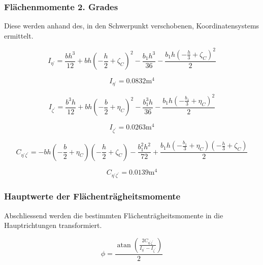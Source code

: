 \documentclass[
  12pt,
  letterpaper,
  DIV=11,
  egregdoesnotlikesansseriftitles]{scrartcl}
\begin{document}
\hypertarget{fluxe4chenmomente-2.-grades}{%
\subsubsection{Flächenmomente 2.
Grades}\label{fluxe4chenmomente-2.-grades}}

Diese werden anhand des, in den Schwerpunkt verschobenen,
Koordinatensystems ermittelt.

\begin{equation}I_{\eta^{'}} = \frac{b h^{3}}{12} + b h \left(- \frac{h}{2} + \zeta_{C}\right)^{2} - \frac{b_{1} h^{3}}{36} - \frac{b_{1} h \left(- \frac{h}{3} + \zeta_{C}\right)^{2}}{2}\end{equation}

\begin{equation}I_{\eta^{'}} = 0.0832 \text{m}^{4}\end{equation}

\begin{equation}I_{\zeta^{'}} = \frac{b^{3} h}{12} + b h \left(- \frac{b}{2} + \eta_{C}\right)^{2} - \frac{b_{1}^{3} h}{36} - \frac{b_{1} h \left(- \frac{b_{1}}{3} + \eta_{C}\right)^{2}}{2}\end{equation}

\begin{equation}I_{\zeta^{'}} = 0.0263 \text{m}^{4}\end{equation}

\begin{equation}C_{\eta^{'}\zeta^{'}} = - b h \left(- \frac{b}{2} + \eta_{C}\right) \left(- \frac{h}{2} + \zeta_{C}\right) - \frac{b_{1}^{2} h^{2}}{72} + \frac{b_{1} h \left(- \frac{b_{1}}{3} + \eta_{C}\right) \left(- \frac{h}{3} + \zeta_{C}\right)}{2}\end{equation}

\begin{equation}C_{\eta^{'}\zeta^{'}} = 0.0139 \text{m}^{4}\end{equation}

\hypertarget{hauptwerte-der-fluxe4chentruxe4gheitsmomente}{%
\subsubsection{Hauptwerte der
Flächenträgheitsmomente}\label{hauptwerte-der-fluxe4chentruxe4gheitsmomente}}

Abschliessend werden die bestimmten Flächenträgheitsmomente in die
Hauptrichtungen transformiert.

\begin{equation}\phi = \frac{\operatorname{atan}{\left(\frac{2 C_{\eta^{'}\zeta^{'}}}{I_{\eta^{'}} - I_{\zeta^{'}}} \right)}}{2}\end{equation}
\end{document}
